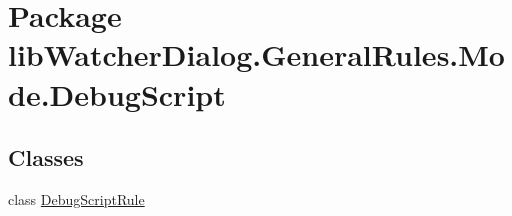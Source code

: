 \hypertarget{namespacelib_watcher_dialog_1_1_general_rules_1_1_mode_1_1_debug_script}{\section{Package lib\+Watcher\+Dialog.\+General\+Rules.\+Mode.\+Debug\+Script}
\label{namespacelib_watcher_dialog_1_1_general_rules_1_1_mode_1_1_debug_script}
}
\subsection*{Classes}
\begin{DoxyCompactItemize}
\item 
class \hyperlink{classlib_watcher_dialog_1_1_general_rules_1_1_mode_1_1_debug_script_1_1_debug_script_rule}{Debug\+Script\+Rule}
\end{DoxyCompactItemize}
